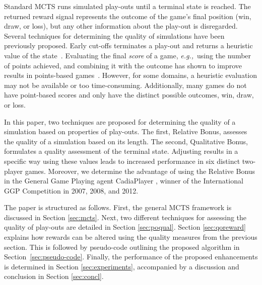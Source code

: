 \documentclass{ecai2014}
\newcommand{\eg}{{\it e.g.,}~}
\begin{document}
Standard MCTS runs simulated play-outs until a terminal state is reached. The returned reward signal represents the outcome of the game's final position (win, draw, or loss), but any other information about the play-out is disregarded. 
Several techniques for determining the quality of simulations have been previously proposed. Early cut-offs terminates a play-out and returns a heuristic value of the state~\cite{Winands2011}. Evaluating the final \emph{score} of a game, \eg using the number of points achieved, and combining it with the outcome  has shown to improve results in points-based games~\cite{shibahara2008combining}. However, for some domains, a heuristic evaluation may not be available or too time-consuming. Additionally, many games do not have point-based scores and only have the distinct possible outcomes, win, draw, or loss.

In this paper, two techniques are proposed for determining the quality of a simulation based on properties of play-outs. The first, Relative Bonus, assesses the quality of a simulation based on its length. The second, Qualitative Bonus, formulates a quality assessment of the terminal state. Adjusting results in a specific way using these values leads to increased performance in six distinct two-player games. Moreover, we determine the advantage of using the Relative Bonus in the General Game Playing agent {\sc CadiaPlayer} \cite{bjornsson2009cadiaplayer}, winner of the International GGP Competition in 2007, 2008, and 2012.

The paper is structured as follows. First, the general MCTS framework is discussed in Section \ref{sec:mcts}. Next, two different techniques for assessing the quality of play-outs are detailed in Section \ref{sec:poqual}. Section \ref{sec:qoreward} explains how rewards can be altered using the quality measures from the previous section. This is followed by pseudo-code outlining the proposed algorithm in Section~\ref{sec:pseudo-code}. Finally, the performance of the proposed enhancements is determined in Section \ref{sec:experiments}, accompanied by a discussion and conclusion in Section \ref{sec:concl}.

\end{document}
